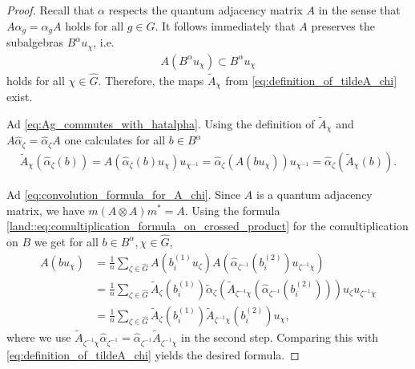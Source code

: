 \documentclass{amsart}
\theoremstyle{definition}
\theoremstyle{definition}
\begin{document}
\begin{proof}
    Recall that $\alpha$ respects the quantum adjacency matrix $A$ in the sense that $A \alpha_g = \alpha_g A$ holds for all $g \in G$. It follows immediately that $A$ preserves the subalgebras $B^\alpha u_\chi$, i.e. 
    \begin{align*}
        A(B^\alpha u_\chi) \subset B^\alpha u_\chi
    \end{align*}
    holds for all $\chi \in \hat{G}$. Therefore, the maps $\tilde{A}_\chi$ from \eqref{eq:definition_of_tildeA_chi} exist.

    Ad \eqref{eq:Ag_commutes_with_hatalpha}.
    Using the definition of $\tilde{A}_\chi$ and $A \hat{\alpha}_\zeta = \hat{\alpha}_\zeta A$ one calculates for all $b \in B^\alpha$
    \begin{align*}
        \tilde{A}_\chi\left(\hat{\alpha}_\zeta(b)\right)
            = A(\hat{\alpha}_\zeta(b) u_\chi) u_{\chi^{-1}}
            = \hat{\alpha}_\zeta\left(A(b u_\chi)\right) u_{\chi^{-1}}
            = \hat{\alpha}_\zeta\left(\tilde{A}_\chi(b)\right).
    \end{align*}
    
    Ad \eqref{eq:convolution_formula_for_A_chi}.
    Since $A$ is a quantum adjacency matrix, we have $m(A \otimes A)m^\ast = A$. Using the formula \eqref{land::eq:comultiplication_formula_on_crossed_product} for the comultiplication on $B$ we get for all $b \in B^\alpha, \chi \in \hat{G}$,
    \begin{align*}
        A(b u_\chi)
            &= \frac{1}{n} \sum_{\zeta \in \hat{G}} A\left( b_i^{(1)} u_\zeta \right) A\left( \hat{\alpha}_{\zeta^{-1}}\left(b_i^{(2)}\right) u_{\zeta^{-1} \chi} \right) \\
            &= \frac{1}{n} \sum_{\zeta \in \hat{G}} \tilde{A}_\zeta\left(b_i^{(1)}\right)\tilde{\alpha}_{\zeta}\left(\tilde{A}_{\zeta^{-1} \chi}\left(\hat{\alpha}_{\zeta^{-1}}\left(b_i^{(2)}\right)\right)\right) u_\zeta u_{\zeta^{-1} \chi} \\
            &= \frac{1}{n} \sum_{\zeta \in \hat{G}} \tilde{A}_\zeta\left(b_i^{(1)}\right)\tilde{A}_{\zeta^{-1} \chi}\left(b_i^{(2)}\right) u_\chi,
    \end{align*}
    where we use $\tilde{A}_{\zeta^{-1}\chi} \hat{\alpha}_{\zeta^{-1}} = \hat{\alpha}_{\zeta^{-1}} \tilde{A}_{\zeta^{-1}\chi}$ in the second step. Comparing this with \eqref{eq:definition_of_tildeA_chi} yields the desired formula.


\end{proof}
\end{document}
